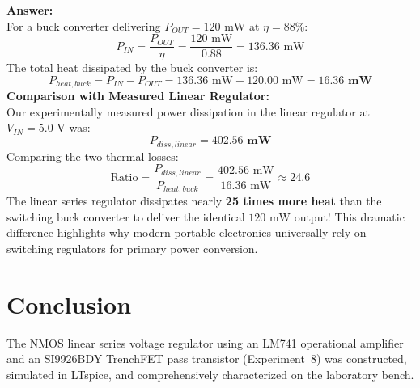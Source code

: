 \documentclass[11pt,a4paper]{article}
\begin{document}
\textbf{Answer:}\\
For a buck converter delivering $P_{OUT} = 120\text{ mW}$ at $\eta = 88\%$:
\begin{equation}
    P_{IN} = \frac{P_{OUT}}{\eta} = \frac{120\text{ mW}}{0.88} = 136.36\text{ mW}
\end{equation}
The total heat dissipated by the buck converter is:
\begin{equation}
    P_{heat,buck} = P_{IN} - P_{OUT} = 136.36\text{ mW} - 120.00\text{ mW} = \mathbf{16.36\text{ mW}}
\end{equation}
\textbf{Comparison with Measured Linear Regulator:}\\
Our experimentally measured power dissipation in the linear regulator at $V_{IN} = 5.0\text{ V}$ was:
\begin{equation}
    P_{diss,linear} = \mathbf{402.56\text{ mW}}
\end{equation}
Comparing the two thermal losses:
\begin{equation}
    \text{Ratio} = \frac{P_{diss,linear}}{P_{heat,buck}} = \frac{402.56\text{ mW}}{16.36\text{ mW}} \approx \mathbf{24.6}
\end{equation}
The linear series regulator dissipates nearly \textbf{25 times more heat} than the switching buck converter to deliver the identical $120\text{ mW}$ output! This dramatic difference highlights why modern portable electronics universally rely on switching regulators for primary power conversion.

\section{Conclusion}
The NMOS linear series voltage regulator using an LM741 operational amplifier and an SI9926BDY TrenchFET pass transistor (Experiment~8) was constructed, simulated in LTspice, and comprehensively characterized on the laboratory bench. 
\end{document}
